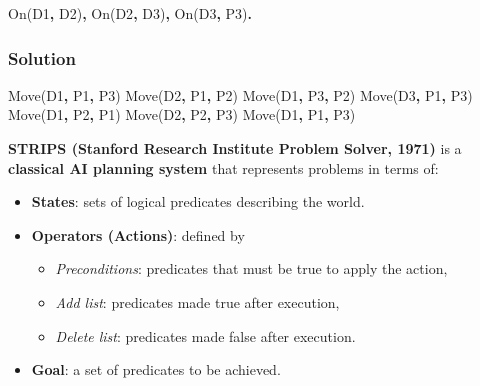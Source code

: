 \documentclass[
  letterpaper,
  DIV=11,
  numbers=noendperiod]{scrartcl}
\newenvironment{Shaded}{\begin{snugshade}}{\end{snugshade}}
\newcommand{\DataTypeTok}[1]{\textcolor[rgb]{0.68,0.00,0.00}{#1}}
\newcommand{\KeywordTok}[1]{\textcolor[rgb]{0.00,0.23,0.31}{\textbf{#1}}}
\newcommand{\NormalTok}[1]{\textcolor[rgb]{0.00,0.23,0.31}{#1}}
\providecommand{\tightlist}{%
  \setlength{\itemsep}{0pt}\setlength{\parskip}{0pt}}
\begin{document}
\begin{Shaded}
\begin{Highlighting}[]
\DataTypeTok{On}\NormalTok{(}\DataTypeTok{D1}\KeywordTok{,} \DataTypeTok{D2}\NormalTok{)}\KeywordTok{,} \DataTypeTok{On}\NormalTok{(}\DataTypeTok{D2}\KeywordTok{,} \DataTypeTok{D3}\NormalTok{)}\KeywordTok{,} \DataTypeTok{On}\NormalTok{(}\DataTypeTok{D3}\KeywordTok{,} \DataTypeTok{P3}\NormalTok{)}\KeywordTok{.}
\end{Highlighting}
\end{Shaded}

\subsubsection{Solution}\label{solution}

\begin{Shaded}
\begin{Highlighting}[]
\DataTypeTok{Move}\NormalTok{(}\DataTypeTok{D1}\KeywordTok{,} \DataTypeTok{P1}\KeywordTok{,} \DataTypeTok{P3}\NormalTok{)}
\DataTypeTok{Move}\NormalTok{(}\DataTypeTok{D2}\KeywordTok{,} \DataTypeTok{P1}\KeywordTok{,} \DataTypeTok{P2}\NormalTok{)}
\DataTypeTok{Move}\NormalTok{(}\DataTypeTok{D1}\KeywordTok{,} \DataTypeTok{P3}\KeywordTok{,} \DataTypeTok{P2}\NormalTok{)}
\DataTypeTok{Move}\NormalTok{(}\DataTypeTok{D3}\KeywordTok{,} \DataTypeTok{P1}\KeywordTok{,} \DataTypeTok{P3}\NormalTok{)}
\DataTypeTok{Move}\NormalTok{(}\DataTypeTok{D1}\KeywordTok{,} \DataTypeTok{P2}\KeywordTok{,} \DataTypeTok{P1}\NormalTok{)}
\DataTypeTok{Move}\NormalTok{(}\DataTypeTok{D2}\KeywordTok{,} \DataTypeTok{P2}\KeywordTok{,} \DataTypeTok{P3}\NormalTok{)}
\DataTypeTok{Move}\NormalTok{(}\DataTypeTok{D1}\KeywordTok{,} \DataTypeTok{P1}\KeywordTok{,} \DataTypeTok{P3}\NormalTok{)}
\end{Highlighting}
\end{Shaded}

\textbf{STRIPS (Stanford Research Institute Problem Solver, 1971)} is a
\textbf{classical AI planning system} that represents problems in terms
of:

\begin{itemize}
\tightlist
\item
  \textbf{States}: sets of logical predicates describing the world.
\item
  \textbf{Operators (Actions)}: defined by

  \begin{itemize}
  \tightlist
  \item
    \emph{Preconditions}: predicates that must be true to apply the
    action,
  \item
    \emph{Add list}: predicates made true after execution,
  \item
    \emph{Delete list}: predicates made false after execution.
  \end{itemize}
\item
  \textbf{Goal}: a set of predicates to be achieved.
\end{itemize}
\end{document}
